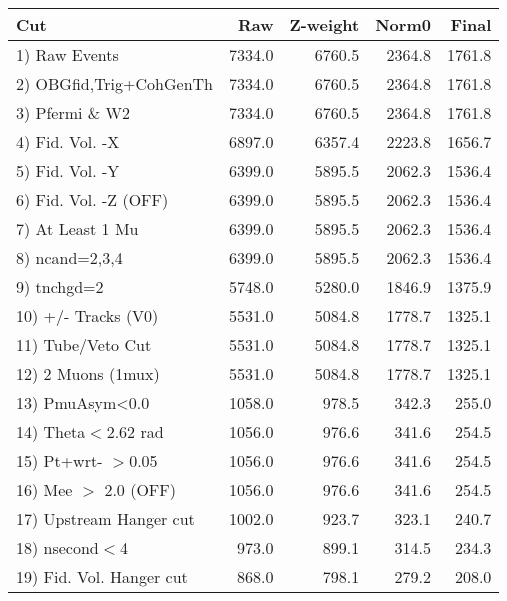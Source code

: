  \begin{table}[h!]\centering
 \begin{tabular}{||l||r|r|r|r||}
 \hline
 \hline
 Cut & Raw & Z-weight & Norm0 & Final \\
 \hline
  1) Raw Events           &      7334.0 &      6760.5 &      2364.8 &      1761.8 \\
  2) OBGfid,Trig+CohGenTh &      7334.0 &      6760.5 &      2364.8 &      1761.8 \\
  3) Pfermi \& W2         &      7334.0 &      6760.5 &      2364.8 &      1761.8 \\
  4) Fid. Vol. -X         &      6897.0 &      6357.4 &      2223.8 &      1656.7 \\
  5) Fid. Vol. -Y         &      6399.0 &      5895.5 &      2062.3 &      1536.4 \\
  6) Fid. Vol. -Z (OFF)   &      6399.0 &      5895.5 &      2062.3 &      1536.4 \\
  7) At Least 1 Mu        &      6399.0 &      5895.5 &      2062.3 &      1536.4 \\
  8) ncand=2,3,4          &      6399.0 &      5895.5 &      2062.3 &      1536.4 \\
  9) tnchgd=2             &      5748.0 &      5280.0 &      1846.9 &      1375.9 \\
 10) +/- Tracks (V0)      &      5531.0 &      5084.8 &      1778.7 &      1325.1 \\
 11) Tube/Veto Cut        &      5531.0 &      5084.8 &      1778.7 &      1325.1 \\
 12) 2 Muons (1mux)       &      5531.0 &      5084.8 &      1778.7 &      1325.1 \\
 13) PmuAsym<0.0          &      1058.0 &       978.5 &       342.3 &       255.0 \\
 14) Theta$<$2.62 rad     &      1056.0 &       976.6 &       341.6 &       254.5 \\
 15) Pt+wrt- $>$0.05      &      1056.0 &       976.6 &       341.6 &       254.5 \\
 16) Mee $>$ 2.0  (OFF)   &      1056.0 &       976.6 &       341.6 &       254.5 \\
 17) Upstream Hanger cut  &      1002.0 &       923.7 &       323.1 &       240.7 \\
 18) nsecond$<$4          &       973.0 &       899.1 &       314.5 &       234.3 \\
 19) Fid. Vol. Hanger cut &       868.0 &       798.1 &       279.2 &       208.0 \\

\end{tabular}
\end{table}
